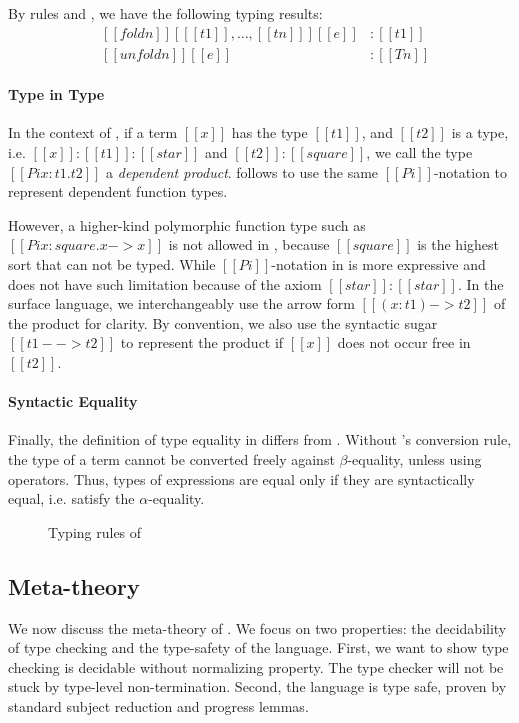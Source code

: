 By rules  and , we have the following
typing results:
\[\begin{array}{lll}
    &[[foldn]] [ [[t1]], \dots, [[tn]] ] [[e]] & : [[t1]] \\
    &[[unfoldn]] [[e]] & : [[Tn]]
\end{array}\]

\paragraph{Type in Type}
 
In the context of \cc, if a term $[[x]]$ has the type $[[t1]]$, and
$[[t2]]$ is a type, i.e. $[[x]]:[[t1]]:[[star]]$ and
$[[t2]]:[[square]]$, we call the type $[[Pi x:t1.t2]]$ a
\emph{dependent product}. \ecore follows \cc to use the same
$[[Pi]]$-notation to represent dependent function types.

However, a higher-kind polymorphic function type such as $[[Pi
    x:square.x->x]]$ is not allowed in \cc, because $[[square]]$ is
the highest sort that can not be typed. While $[[Pi]]$-notation in
\ecore is more expressive and does not have such limitation because of
the axiom $[[star]]:[[star]]$. In the surface language, we
interchangeably use the arrow form $[[(x:t1)->t2]]$ of the product for
clarity. By convention, we also use the syntactic sugar $[[t1 -->
    t2]]$ to represent the product if $[[x]]$ does not occur free in
$[[t2]]$.

\paragraph{Syntactic Equality}
Finally, the definition of type equality in \ecore differs from
\cc. Without \cc's conversion rule, the type of a term cannot be
converted freely against $\beta$-equality, unless using \cast
operators. Thus, types of expressions are equal only if they are
syntactically equal, i.e. satisfy the $\alpha$-equality.

\begin{figure}
    \ottdefnctx{}\ottinterrule
    \ottdefnexpr{}
    \caption{Typing rules of \ecore}
    \label{fig:ecore:typing}
\end{figure}

\subsection{Meta-theory}\label{sec:ecore:meta}
We now discuss the meta-theory of \ecore. We focus on two properties: the
decidability of type checking and the type-safety of the language. First, we
want to show type checking \ecore is decidable without normalizing property.
The type checker will not be stuck by type-level non-termination. Second, the
language is type safe, proven by standard subject reduction and progress
lemmas.

